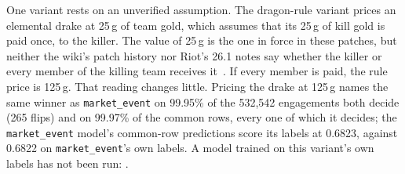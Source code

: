 One variant rests on an unverified assumption. The dragon-rule variant prices an elemental
drake at 25\,g of team gold, which assumes that its 25\,g of kill gold is paid once, to the killer. The
value of 25\,g is the one in force in these patches, but neither the wiki's patch history nor Riot's
26.1 notes say whether the killer or every member of the killing team receives
it~\cite{lolwiki2026dragonpit,riot2026patch261}. If every member is paid, the rule price is 125\,g.
That reading changes little. Pricing the drake at 125\,g names the same winner as
\texttt{market\_event} on 99.95\% of the 532,542 engagements both decide (265 flips) and on 99.97\% of
the common rows, every one of which it decides; the \texttt{market\_event} model's common-row
predictions score its labels at 0.6823, against 0.6822 on \texttt{market\_event}'s own labels. A model
trained on this variant's own labels has not been run:
.

